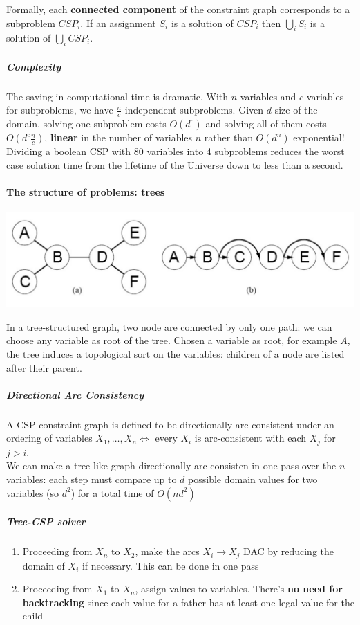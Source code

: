 \documentclass[10pt]{report}
\begin{document}
Formally, each \textbf{connected component} of the constraint graph corresponds to a subproblem $CSP_i$. If an assignment $S_i$ is a solution of $CSP_i$ then $\bigcup_i S_i$ is a solution of $\bigcup_i CSP_i$.
\subparagraph{Complexity} The saving in computational time is dramatic. With $n$ variables and $c$ variables for subproblems, we have $\frac{n}{c}$ independent subproblems. Given $d$ size of the domain, solving one subproblem costs $O(d^c)$ and solving all of them costs $O(d^c\frac{n}{c})$, \textbf{linear} in the number of variables $n$ rather than $O(d^n)$ exponential!\\
Dividing a boolean CSP with 80 variables into 4 subproblems reduces the worst case solution time from the lifetime of the Universe down to less than a second.
\paragraph{The structure of problems: trees}
\begin{center}
	\includegraphics[scale=0.5]{9.png}
\end{center}
In a tree-structured graph, two node are connected by only one path: we can choose any variable as root of the tree. Chosen a variable as root, for example $A$, the tree induces a topological sort on the variables: children of a node are listed after their parent.
\subparagraph{Directional Arc Consistency} A CSP constraint graph is defined to be directionally arc-consistent under an ordering of variables $X_1,\ldots,X_n \Leftrightarrow$ every $X_i$ is arc-consistent with each $X_j$ for $j>i$.\\
We can make a tree-like graph directionally arc-consisten in one pass over the $n$ variables: each step must compare up to $d$ possible domain values for two variables (so $d^2$) for a total time of $O(nd^2)$
\subparagraph{Tree-CSP solver}\begin{enumerate}
	\item Proceeding from $X_n$ to $X_2$, make the arcs $X_i\rightarrow X_j$ DAC by reducing the domain of $X_i$ if necessary. This can be done in one pass
	\item Proceeding from $X_1$ to $X_n$, assign values to variables. There's \textbf{no need for backtracking} since each value for a father has at least one legal value for the child
\end{enumerate}
\end{document}
